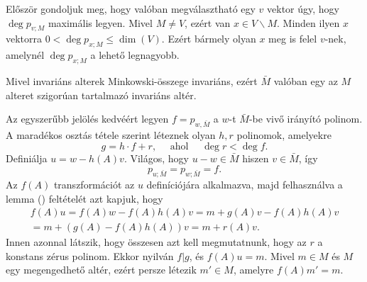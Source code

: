 \documentclass[9pt, a4paper, showtrims]{memoir}
\makeatletter
\renewenvironment{proof}[1][\proofname]
    {\par\pushQED{\qed}%
    \normalfont \topsep6\p@\@plus6\p@\relax
    \trivlist
    \item[\hskip\labelsep
        \itshape
    #1\@addpunct{:}]\ignorespaces}
    {\popQED\endtrivlist\@endpefalse}
\theoremstyle{plain}
\theoremstyle{remark}
\theoremstyle{definition}
\makeatother
\begin{document}
\begin{proof}
    Először gondoljuk meg, hogy valóban megválasztható egy $v$ vektor úgy, hogy $\deg p_{v;M}$ maximális legyen.
    Mivel $M\neq V$, ezért van $x\in V\smallsetminus M$.
    Minden ilyen $x$ vektorra 
    \begin{math}
        0<\deg p_{x;M}\leq \dim \left( V \right).
    \end{math}
    Ezért bármely olyan $x$ meg is felel $v$-nek, amelynél $\deg p_{x;M}$ a lehető legnagyobb.

    Mivel invariáns alterek Minkowski-összege invariáns, ezért $\bar{M}$ valóban egy az $M$ alteret szigorúan tartalmazó invariáns altér.

    Az egyszerűbb jelölés kedvéért legyen $f=p_{w,\bar{M}}$ a $w$-t $\bar{M}$-be vivő irányító polinom.
    A maradékos osztás tétele szerint léteznek olyan $h,r$ polinomok, amelyekre
    \[
        g=h\cdot f  + r, 
        \quad\text{ ahol }\quad
        \deg r<\deg f.
    \]
    Definiálja $u=w-h\left( A \right)v.$
    Világos, hogy $u-w\in \bar{M}$ hiszen $v\in\bar{M}$, így 
    \[
        p_{u;\bar{M}}=p_{w;\bar{M}}=f.
    \]
    Az $f\left( A \right)$ transzformációt az $u$ definíciójára alkalmazva, 
    majd felhasználva a lemma (\dag) feltételét azt kapjuk, hogy
    \begin{multline*}
        f\left( A \right)u
        =
        f\left( A \right)w
        -f\left( A \right)h\left( A \right)v
        =
        m+g\left( A \right)v
        -f\left( A \right)h\left( A \right)v
        \\
        =
        m+
        \left( g\left( A \right)-f\left( A \right)h\left( A \right) \right)v
        =
        m+
        r\left( A \right)v.
        \tag{\ddag}
    \end{multline*}
        Innen azonnal látszik, hogy összesen azt kell megmutatnunk, hogy az $r$ a konstans zérus polinom.
    Ekkor nyilván $f|g$, és $f\left( A \right)u=m$. 
    Mivel $m\in M$ és $M$ egy megengedhető altér, ezért persze létezik $m'\in M$, 
    amelyre $f\left( A \right)m'=m.$


\end{proof}
\end{document}
